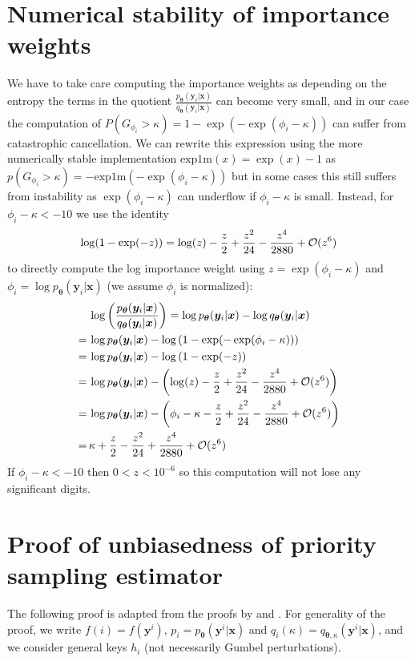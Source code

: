 \section{Numerical stability of importance weights}
\label{app:importance_weights_numeric_stability}
We have to take care computing the importance weights as depending on the entropy the terms in the quotient $\frac{p_{\bm{\theta}}(\bm{y}_i|\bm{x})}{q_{\bm{\theta}}(\bm{y}_i|\bm{x})}$ can become very small, and in our case the computation of $P(G_{\phi_i} > \kappa) = 1 - \exp (-\exp(\phi_i - \kappa))$ can suffer from catastrophic cancellation. We can rewrite this expression using the more numerically stable implementation $\text{exp1m}(x) = \exp(x) - 1$ as $p(G_{\phi_i} > \kappa) = -\text{exp1m}(-\exp(\phi_i - \kappa))$ but in some cases this still suffers from instability as $\exp(\phi_i - \kappa)$ can underflow if $\phi_i - \kappa$ is small. Instead, for $\phi_i - \kappa < -10$ we use the identity
\begin{equation*}
    \log (1 - \exp(-z)) = \log(z) - \frac{z}{2} + \frac{z^2}{24} - \frac{z^4}{2880} + \mathcal{O}(z^6)
\end{equation*}
to directly compute the log importance weight using $z = \exp(\phi_i - \kappa)$ and $\phi_i = \log p_{\bm{\theta}}(\bm{y}_i|\bm{x})$ (we assume $\phi_i$ is normalized):
\begin{align*}
    & \, \log\left(\frac{p_{\bm{\theta}}(\bm{y}_i|\bm{x})}{q_{\bm{\theta}}(\bm{y}_i|\bm{x})}\right) = \log p_{\bm{\theta}}(\bm{y}_i|\bm{x}) - \log q_{\bm{\theta}}(\bm{y}_i|\bm{x}) \\
    =& \, \log p_{\bm{\theta}}(\bm{y}_i|\bm{x}) - \log \left( 1 - \exp (-\exp(\phi_i - \kappa)) \right) \\
    =& \, \log p_{\bm{\theta}}(\bm{y}_i|\bm{x}) - \log \left( 1 - \exp (-z) \right) \\
    =& \, \log p_{\bm{\theta}}(\bm{y}_i|\bm{x}) - \left( \log(z) - \frac{z}{2} + \frac{z^2}{24} - \frac{z^4}{2880} + \mathcal{O}(z^6) \right) \\
    =& \, \log p_{\bm{\theta}}(\bm{y}_i|\bm{x})  - \left( \phi_i - \kappa - \frac{z}{2} + \frac{z^2}{24} - \frac{z^4}{2880} + \mathcal{O}(z^6) \right) \\
    =& \, \kappa + \frac{z}{2} - \frac{z^2}{24} + \frac{z^4}{2880} + \mathcal{O}(z^6)
\end{align*}
If $\phi_i - \kappa < -10$ then $0 < z < 10^{-6}$ so this computation will not lose any significant digits.

\clearpage
\section{Proof of unbiasedness of priority sampling estimator}
\label{app:unbiased_priority_sampling}
The following proof is adapted from the proofs by \citet{duffield2007priority} and \citet{vieira2017estimating}. For generality of the proof, we write $f(i) = f(\bm{y}^i)$, $p_i = p_{\bm{\theta}}(\bm{y}^i|\bm{x})$ and $q_i(\kappa) = q_{\bm{\theta},\kappa}(\bm{y}^i|\bm{x})$, and we consider general keys $h_i$ (not necessarily Gumbel perturbations). 

